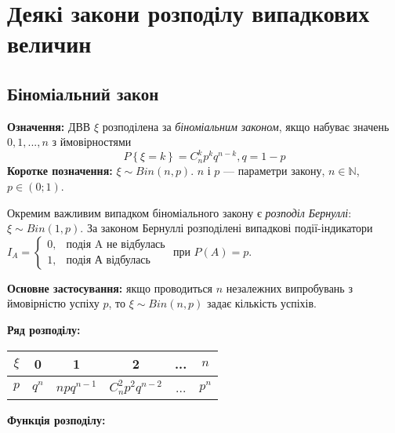 \section{Деякі закони розподілу випадкових величин}

\subsection{Біноміальний закон}
\noindent\textbf{Означення:}
    ДВВ $\xi$ розподілена за \emph{біноміальним законом}, 
    якщо набуває значень $0,1,...,n$ з ймовірностями \begin{equation}
        P\left\{\xi = k\right\} = C_n^k p^k q^{n-k}, q = 1 - p
    \end{equation}
\textbf{Коротке позначення:} $\xi \sim {Bin}(n, p)$.
    $n$ і $p$ --- параметри закону, $n\in \mathbb{N}$, $p\in (0;1)$.

Окремим важливим випадком біноміального закону є \emph{розподіл Бернуллі}: $\xi \sim {Bin}(1, p)$.
За законом Бернуллі розподілені випадкові події-індикатори $I_A = \begin{cases}
    0, & \text{подія A не відбулась}\\ 1, & \text{подія А відбулась}
\end{cases}$ при $P(A) = p$.

\noindent\textbf{Основне застосування:} якщо проводиться $n$ незалежних випробувань з ймовірністю успіху $p$, 
то $\xi \sim {Bin}(n, p)$ задає кількість успіхів.

\noindent\textbf{Ряд розподілу:}

\begin{tabular}{c|c|c|c|c|c}
    $\xi$ & 0 & 1 & 2 & ... & $n$ \\
    \hline
    $p$ & $q^n$ & $npq^{n-1}$ & $C_n^2 p^2 q^{n-2}$ & ... & $p^n$
\end{tabular}

\noindent\textbf{Функція розподілу:}

